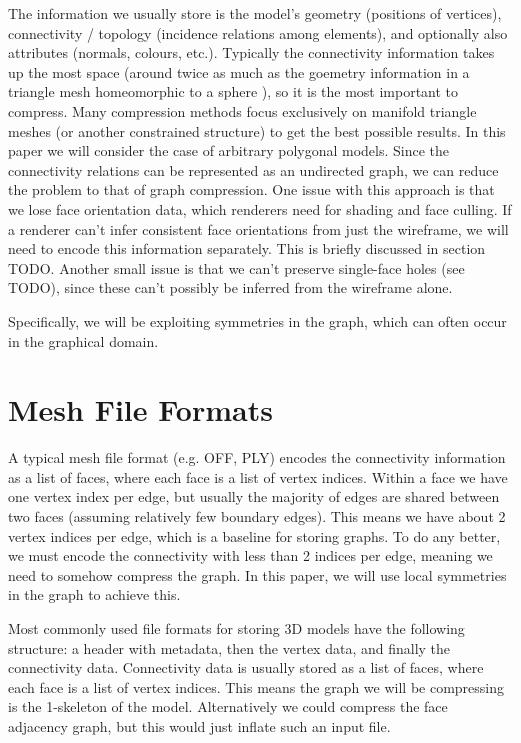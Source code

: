 \documentclass{egpubl}
\begin{document}
The information we usually store is the model's geometry (positions of vertices), connectivity / topology (incidence relations among elements), and optionally also attributes (normals, colours, etc.).
Typically the connectivity information takes up the most space (around twice as much as the goemetry information in a triangle mesh homeomorphic to a sphere \cite{rossignac1999edgebreaker}), so it is the most important to compress.
Many compression methods focus exclusively on manifold triangle meshes (or another constrained structure) to get the best possible results.  
In this paper we will consider the case of arbitrary polygonal models. Since the connectivity relations can be represented as an undirected graph, we can reduce the problem to that of graph compression.
One issue with this approach is that we lose face orientation data, which renderers need for shading and face culling. If a renderer can't infer consistent face orientations from just the wireframe, we will need to encode this information separately. This is briefly discussed in section TODO.
Another small issue is that we can't preserve single-face holes (see TODO), since these can't possibly be inferred from the wireframe alone.

Specifically, we will be exploiting symmetries in the graph, which can often occur in the graphical domain.

\section{Mesh File Formats}

A typical mesh file format (e.g. OFF, PLY) encodes the connectivity information as a list of faces, where each face is a list of vertex indices. Within a face we have one vertex index per edge, but usually the majority of edges are shared between two faces (assuming relatively few boundary edges). This means we have about 2 vertex indices per edge, which is a baseline for storing graphs. To do any better, we must encode the connectivity with less than 2 indices per edge, meaning we need to somehow compress the graph. In this paper, we will use local symmetries in the graph to achieve this.

Most commonly used file formats for storing 3D models have the following structure: a header with metadata, then the vertex data, and finally the connectivity data. Connectivity data is usually stored as a list of faces, where each face is a list of vertex indices. This means the graph we will be compressing is the 1-skeleton of the model. Alternatively we could compress the face adjacency graph, but this would just inflate such an input file.
\end{document}
